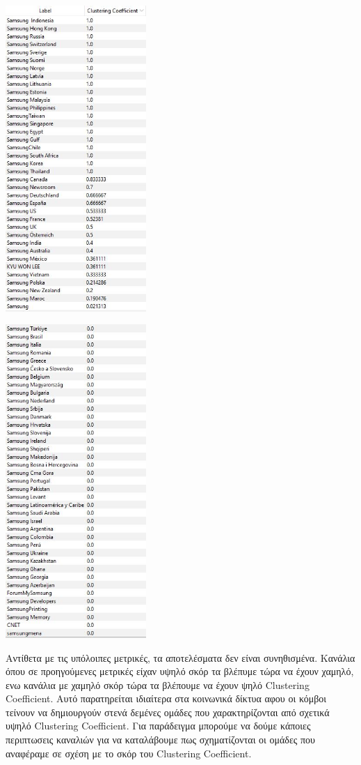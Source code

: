 \documentclass[12pt]{article}
\begin{document}
	\begin{center}
		\begin{adjustbox}{valign=t}
			\includegraphics[width=0.4\textwidth]{photos-files/section8/distr_values1.JPG}
		\end{adjustbox}
		\hfill
		\begin{adjustbox}{valign=t}
			\includegraphics[width=0.4\textwidth]{photos-files/section8/distr_values2.JPG}
		\end{adjustbox}
	\end{center}
	Αντίθετα με τις υπόλοιπες μετρικές, τα αποτελέσματα δεν είναι συνηθισμένα. Κανάλια όπου σε προηγούμενες μετρικές είχαν υψηλό σκόρ τα βλέπυμε τώρα να έχουν χαμηλό, ενω κανάλια με χαμηλό σκόρ τώρα τα βλέπουμε να έχουν ψηλό Clustering Coefficient. Αυτό παρατηρείται ιδιαίτερα στα κοινωνικά δίκτυα αφου οι κόμβοι τείνουν να δημιουργούν στενά δεμένες ομάδες που χαρακτηρίζονται από σχετικά υψηλό Clustering Coefficient. Για παράδειγμα μπορούμε να δούμε κάποιες περιπτωσεις καναλιών για να καταλάβουμε πως σχηματίζονται οι ομάδες που αναφέραμε σε σχέση με το σκόρ του Clustering Coefficient.
	
\end{document}
